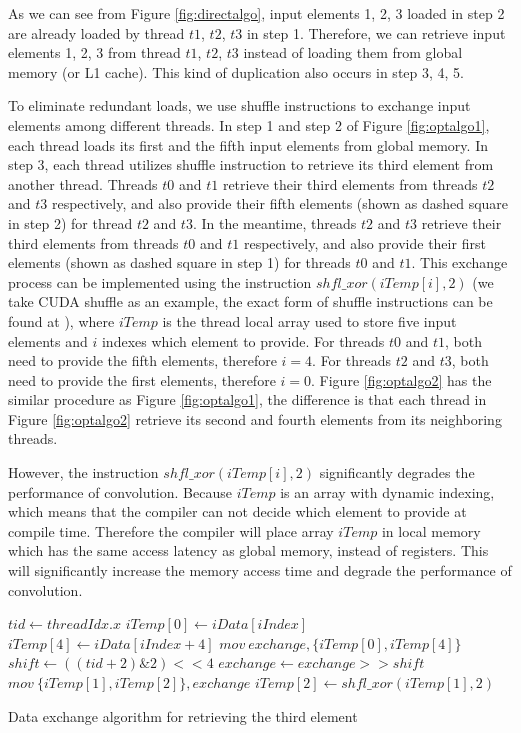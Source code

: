 As we can see from Figure \ref{fig:directalgo}, input elements 1, 2, 3 loaded in step 2 are already loaded by thread $t1$, $t2$, $t3$ in
step 1. Therefore, we can retrieve input elements 1, 2, 3 from thread $t1$, $t2$, $t3$ instead of loading them from global memory (or L1
cache). This kind of duplication also occurs in step 3, 4, 5.

To eliminate redundant loads, we use shuffle instructions to exchange input elements among different threads. In step 1
and step 2 of Figure \ref{fig:optalgo1}, each thread loads its first and the fifth input elements from global memory. In step 3, each
thread utilizes shuffle instruction to retrieve its third element from another thread. Threads $t0$ and $t1$ retrieve their third elements
from threads $t2$ and $t3$ respectively, and also provide their fifth elements (shown as dashed square in step 2) for thread $t2$ and $t3$.
In the meantime, threads $t2$ and $t3$ retrieve their third elements from threads $t0$ and $t1$ respectively, and also provide their first
elements (shown as dashed square in step 1) for threads $t0$ and $t1$. This exchange process can be implemented using the instruction
$shfl\_xor(iTemp[i],2)$ (we take CUDA shuffle as an example, the exact form of shuffle instructions can be found at \cite{CUDAtoolkit}), where $iTemp$ is the thread local
array used to store five input elements and $i$ indexes which element to provide. For threads $t0$ and $t1$, both need to provide the fifth
elements, therefore $i=4$. For threads $t2$ and $t3$, both need to provide the first elements, therefore $i=0$. Figure \ref{fig:optalgo2}
has the similar procedure as Figure \ref{fig:optalgo1}, the difference is that each thread in Figure \ref{fig:optalgo2} retrieve its second
and fourth elements from its neighboring threads.


However, the instruction $shfl\_xor(iTemp[i],2)$ significantly degrades the performance of convolution. Because $iTemp$ is an array with
dynamic indexing, which means that the compiler can not decide which element to provide at compile time. Therefore the compiler will
place array $iTemp$ in local memory which has the same access latency as global memory, instead of registers. This will significantly
increase the memory access time and degrade the performance of convolution.

\begin{algorithm}
	$tid \gets threadIdx.x$\;
	$iTemp[0] \gets iData[iIndex]$\;
	$iTemp[4] \gets iData[iIndex+4]$\;
	$mov\ exchange, \{iTemp[0], iTemp[4]\}$\;
	$shift \gets ((tid+2)\&2)<<4$\;
	$exchange \gets exchange >> shift$\;
	$mov\ \{iTemp[1],iTemp[2]\}, exchange$\;
	$iTemp[2] \gets shfl\_xor(iTemp[1],2)$\;	
	
	\caption{Data exchange algorithm for retrieving the third element}
	\label{algo:basic}
\end{algorithm}

